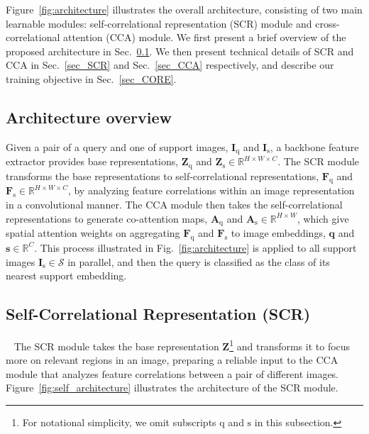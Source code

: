 \documentclass[10pt,twocolumn,letterpaper]{article}
\newcommand{\Real}{\mathbb{R}}
\newcommand{\bs}{\mathbf{s}}
\newcommand{\bq}{\mathbf{q}}
\newcommand{\bF}{\mathbf{F}}
\newcommand{\bA}{\mathbf{A}}
\newcommand{\bI}{\mathbf{I}}
\newcommand{\bZ}{\mathbf{Z}}
\newcommand{\texts}{{\text{s}}}
\newcommand{\textq}{{\text{q}}}
\newcommand{\abbself}{SCR\xspace}
\newcommand{\abbcross}{CCA\xspace}
\begin{document}
Figure~\ref{fig:architecture} illustrates the overall architecture, consisting of two main learnable modules: self-correlational representation (\abbself) module and cross-correlational attention (\abbcross) module.
We first present a brief overview of the proposed architecture in Sec.~\ref{sec_overview}.
We then present technical details of \abbself and \abbcross in Sec.~\ref{sec_SCR} and Sec.~\ref{sec_CCA} respectively, and describe our training objective in Sec.~\ref{sec_CORE}.








\subsection{Architecture overview}
\label{sec_overview}
Given a pair of a query and one of support images, $\bI_\textq$ and $\bI_\texts$, a backbone feature extractor provides base representations, $\bZ_\textq$ and $\bZ_\texts \in \mathbb{R}^{H \times W \times C}$.
The SCR module transforms the base representations to self-correlational representations, $\bF_\textq$ and $\bF_\texts \in \mathbb{R}^{H \times W \times C}$, by analyzing feature correlations within an image representation in a convolutional manner.
The CCA module then takes the self-correlational representations to generate co-attention maps, $\bA_\textq$ and $ \bA_\texts \in \Real^{H \times W}$, which give spatial attention weights on aggregating $\bF_\textq$ and $\bF_\texts$ to image embeddings, $\bq$ and $\bs \in \Real^{C}$.
This process illustrated in Fig.~\ref{fig:architecture} is applied to all support images $\bI_\texts \in \mathcal{S}$ in parallel, and then the query is classified as the class of its nearest support embedding.







\subsection{Self-Correlational Representation (\abbself)}~\label{sec_SCR}
The \abbself module takes the base representation $\bZ$\footnote{For notational simplicity, we omit subscripts $\textq$ and $\texts$ in this subsection.} and transforms it to focus more on relevant regions in an image, preparing a reliable input to the \abbcross module that analyzes feature correlations between a pair of different images.
Figure~\ref{fig:self_architecture} illustrates the architecture of the \abbself module.
\end{document}
